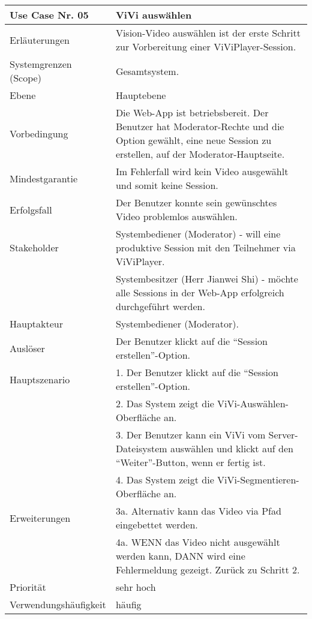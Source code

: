 \begin{tabularx}{\linewidth}{|l|X|}
	\hline
	Use Case Nr. 05			& \textbf{ViVi auswählen} \\ \hline
	Erläuterungen			& Vision-Video auswählen ist der erste Schritt zur Vorbereitung 
							  einer ViViPlayer-Session. \\ \hline
	Systemgrenzen (Scope)	& Gesamtsystem. \\ \hline
	Ebene					& Hauptebene \\ \hline
	Vorbedingung			& Die Web-App ist betriebsbereit. Der Benutzer hat 
							  Moderator-Rechte und die Option gewählt, eine neue Session zu 
							  erstellen, auf der Moderator-Hauptseite. \\ \hline
	Mindestgarantie			& Im Fehlerfall wird kein Video ausgewählt und somit keine 
							  Session.\\ \hline
	Erfolgsfall 			& Der Benutzer konnte sein gewünschtes Video problemlos auswählen. 
							  \\ \hline
	Stakeholder				& Systembediener (Moderator) - will eine produktive Session mit den 
							  Teilnehmer via ViViPlayer. \\
							& Systembesitzer (Herr Jianwei Shi) - möchte alle Sessions in der 
							  Web-App erfolgreich durchgeführt werden. \\ \hline
	Hauptakteur				& Systembediener (Moderator). \\ \hline
	Auslöser				& Der Benutzer klickt auf die ``Session erstellen''-Option. \\ \hline	
	Hauptszenario			& 1. Der Benutzer klickt auf die ``Session erstellen''-Option. \\
							& 2. Das System zeigt die ViVi-Auswählen-Oberfläche an. \\
							& 3. Der Benutzer kann ein ViVi vom Server-Dateisystem auswählen 
							  und klickt auf den ``Weiter''-Button, wenn er fertig ist. \\
							& 4. Das System zeigt die ViVi-Segmentieren-Oberfläche an. \\ \hline
	Erweiterungen			& 3a. Alternativ kann das Video via Pfad eingebettet werden. \\ 
							& 4a. WENN das Video nicht ausgewählt werden kann, DANN wird eine 
							  Fehlermeldung gezeigt. Zurück zu Schritt 2. \\ \hline
	Priorität				& sehr hoch \\ \hline
	Verwendungshäufigkeit	& häufig \\ \hline
\end{tabularx}